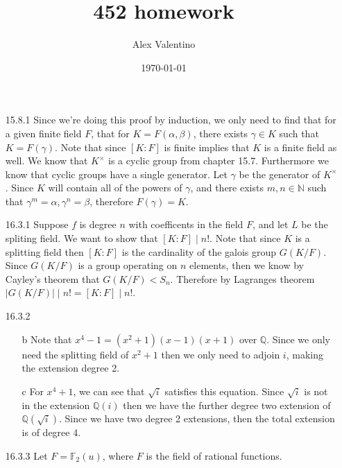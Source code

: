 \documentclass[12pt, letterpaper]{article}
\date{\today}
\author{Alex Valentino}
\title{452 homework}
\newcommand{\N}{\mathbb{N}}
\newcommand{\Q}{\mathbb{Q}}
\begin{document}
\begin{enumerate}
	\item[15.8.1] Since we're doing this proof by induction, we only need to find that for a 
	given finite field $F$, that for $K = F(\alpha,\beta)$, there exists $\gamma \in K$ such 
	that $K = F(\gamma)$.  Note that since $[K : F]$ is finite implies that $K$ is a finite 
	field as well.  We know that $K^{\times}$ is a cyclic group from chapter 15.7.  Furthermore
	we know that cyclic groups have a single generator.  Let $\gamma$ be the generator of 
	$K^{\times}$.  Since $K$ will contain all of the powers of $\gamma$, and there exists 
	$m,n \in \N$ such that $\gamma^m = \alpha, \gamma^n = \beta$, therefore $F(\gamma) = K$.
	\item[16.3.1] Suppose $f$ is degree $n$ with coefficents in the field $F$, and let $L$ be
	the spliting field.  We want to show that $[K:F] \mid n!$.  Note that since $K$ is a
	splitting field then $[K:F]$ is the cardinality of the galois group $G(K/F)$.  Since 
	$G(K/F)$ is a group operating on $n$ elements, then we know by Cayley's theorem that 
	$G(K/F) < S_n$.  Therefore by Lagranges theorem $|G(K/F)| \mid n!  = [K:F] \mid n!$.   
	\iffalse Note that every element in 
	$K$ can be generated by taking a polynomial in the ring $p \in F[u_1,\cdots,u_n]$ and 
	evaluating $p$ on the roots of $f$, $\alpha_1,\cdots, \alpha_n$ (counting multiplicity), 
	$p(\alpha_1,\cdots,\alpha_n)$.  Note that the basis 
	elements of $F[u_1,\cdots,u_n]$ are the monomials $\prod_{i=1}^n u_i^{c_i}, c_i \in
	 \N \cup \{0\}$.  If one evaluates $u_i \mapsto \alpha_i$ we find that the basis now 
	 goes down to at most $n!$ elements, as any power of a root maps to a linear 
	 combination of other roots, giving us a total of $n!$ potential items. 
	\fi 
	\item[16.3.2]
	\begin{enumerate}
		\item[b] Note that  $x^4 -1 =(x^2 + 1)(x-1)(x+1)$ over $\Q$.  Since we only need
		the splitting field of $x^2 + 1$ then we only need to adjoin $i$, making the extension
		degree 2.
		\item[c] For $x^4 +1$, we can see that $\sqrt{i}$ satisfies this equation.  Since 
		$\sqrt{i}$ is not in the extension $\Q(i)$ then we have the further degree two extension
		of $\Q(\sqrt{i})$.  Since we have two degree 2 extensions, then the total extension 
		is of degree 4.   
	\end{enumerate}
	\item[16.3.3] Let $F = \mathbb{F}_2 (u)$, where $F$ is the field of rational functions.  

\end{enumerate}
\end{document}
